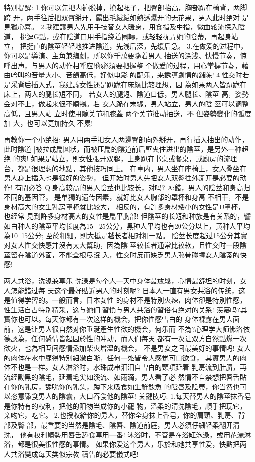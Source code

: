 \documentclass[12pt,UTF8]{ctexbook}
\begin{document}
特别提醒:
1.你可以先把内褲脱掉，撩起裙子，把臀部抬高，胸部趴在椅背，两脚跨
开，两手往后把双臀掰开，露出毛絨絨如熟透爆开的无花果，男人此时绝对
是見獵心喜。
2.我建議男人先用手技替女人暖身，用食指及中指，微曲轮流探入陰道，
挑逗G點，或在陰道口用手指绕着圈轉，或轻轻抚弄她的陰蒂，再起身站立，
把挺直的陰莖轻轻地推进陰道，先浅后深，先缓后急。
3.在做爱的过程中，你可以是導演、主角兼编劇，所以你千萬要隨着男人
抽送的深浅、快慢节奏，惊呼出声，与男人的动作相呼应!你必須要把握整
个做爱的过程，用心掌握节奏，藉由吟叫的音量大小、音韻高低，好似电影
的配乐，来誘導劇情的鋪陈!
4.性交时若是采背后插入式，我建議女性还是趴跪在床緣比较理想，因
為如果两人皆趴跪在床上，两人的腿长短不同，
若女人的腿短、陰道口低，男人腿长、陰莖
高，姿勢会对不上，做起来很不順暢。若
女人跪在末緣，男人站立，男人的陰
莖可以调整高低，且男人站
立时使用髋关节和膝蓋
两个关节推动抽送，不
但姿勢變化的弧度加
大，也可以更加持久
不累!

再教你一个小绝招:
男人用两手把女人两邊臀部向外掰开，再行插入抽出的动作，此时陰道
]被拉成扁圓状，而被压扁的陰道前后壁夾住进出的陰莖，是另外一种超绝
的爽!
如果是站立，則女性張开双腿，上身趴在书桌或餐桌，或廚房的流理
台，都是很理想的地點，其他技巧同上。
在車内，男人坐在座椅上，女人叠坐在男人身上插入也是很好的姿勢，
但开始时男人先把女人双臀往外掰开是必要的动作!
有問必答
Q:身高较高的男人陰莖也比较长，对吗?
A:錯，男人的陰莖和身高归不同的基因管，
是单獨的遗传因素，就好比女人胸部的罩杯和身高
不相干，不是身材高大的女生乳房罩杯就比较大，
相反的，有許多身材矮小的女性是D罩杯，也经常
見到許多身材高大的女性是扁平胸部!
但陰莖的长短和种族是有关系的，譬如白种人的陰莖平均长度為15
~25公分，黑种人平均也有20公分以上，黄种人平均為10~15公分;
至於粗細，則大抵是越长者相对粗一點。
陰莖长度超过15公分其實对女人性交快感并沒有太大幫助，因為陰
莖较长者通常比较软，且性交时一段陰莖留在陰道外面，不能全根尽沒
入，性交时反而缺乏男人恥骨碰撞女人陰蒂的快感!

两人共浴，洗澡兼享乐
洗澡是每个人一天中身体最放鬆，心情最舒坦的时刻，女人怎能錯过每
天这个最好貼近男人的时刻呢?
日本人一直有男女共浴的传统，这是值得学習的。一般而言，日本女性
的身材不是特別火辣，肉体卻是特別性感，性生活自古特別精采，这与她们
習慣与男人共浴的習俗有绝对的关系!
羨慕吗?其實你也可以。每天你都有一次这样的機会，把你性感雪白的
身体裸露在男人面前，这是让男人很自然对你垂涎產生性欲的機会，何乐而
不為?心理学大师佛洛依德認為，任何感情皆起因於性的冲动，而人们每天
都有一次让双方自然點燃一次欲火，也為相互间感情添加柴火增溫的機会，
不是男女之间最美好的事情吗!
女人的肉体在水中顯得特別細嫩白晰，任何一处皆令人感觉可口欲食，
其實男人的肉体不也是一样。女人淋浴时，水珠成串汨汨自雪白的頸項延着
乳房流到肚臍，再流经黝黑的陰毛，延着毛尖如溪流、如雨滴，男人看了必
然情不自禁想把唇舌貼在你的乳房，舔吮你的乳头，蹲下来吸食如生鮮鮑魚
的陰唇及陰蒂，你当然也可以恣意舔食男人的陰囊，大口吞食他的陰莖!
关鍵技巧:
1.每天替男人的陰莖抹香皂是你特有的权利，把他的阳物当成你的小寵
物，溫柔的清洗陰毛，順手把玩它，亲吻它，吃它。
2.也授权給你的男人，替你全身抹上香皂，你的肩頸、乳房、背部及臀
部，最重要的当然是陰毛、陰唇、陰道前庭，男人必須仔細轻柔翻开清洗，
他有权利順勢用唇舌舔食享用一番!
沐浴时，不管是在浴缸泡澡，或用花灑淋浴，都是很美很性感的事情。
如果你爱这个男人，乐於和她共享性爱，快點把两人共浴變成每天类似宗教
禱告的必要儀式吧!
\end{document}
